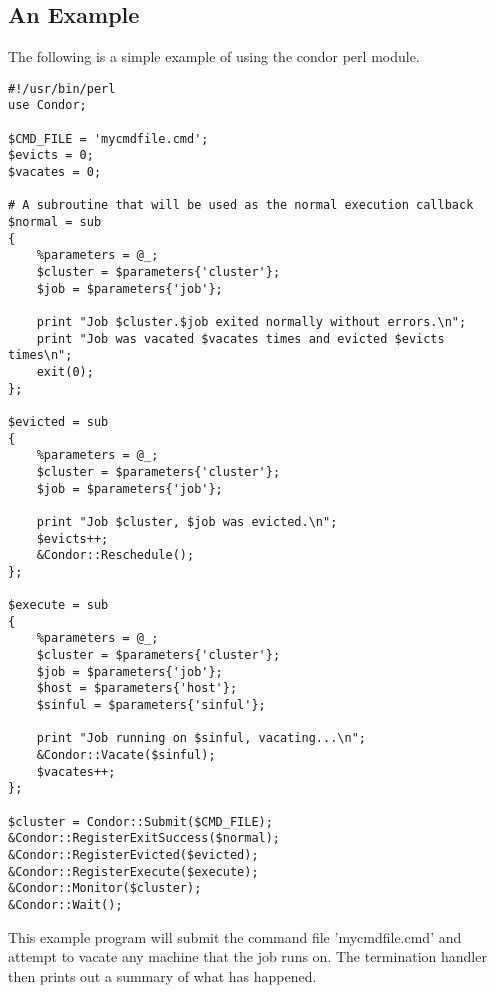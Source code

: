 \subsection{An Example}
The following is a simple example of using the condor perl module.
\begin{verbatim}
#!/usr/bin/perl
use Condor;

$CMD_FILE = 'mycmdfile.cmd';
$evicts = 0;
$vacates = 0;

# A subroutine that will be used as the normal execution callback
$normal = sub
{
    %parameters = @_;
    $cluster = $parameters{'cluster'};
    $job = $parameters{'job'};

    print "Job $cluster.$job exited normally without errors.\n";
    print "Job was vacated $vacates times and evicted $evicts times\n";
    exit(0);
};	

$evicted = sub
{
    %parameters = @_;
    $cluster = $parameters{'cluster'};
    $job = $parameters{'job'};

    print "Job $cluster, $job was evicted.\n";
    $evicts++;
    &Condor::Reschedule();	
};

$execute = sub
{
    %parameters = @_;
    $cluster = $parameters{'cluster'};
    $job = $parameters{'job'};
    $host = $parameters{'host'};
    $sinful = $parameters{'sinful'};

    print "Job running on $sinful, vacating...\n";
    &Condor::Vacate($sinful);
    $vacates++;
};

$cluster = Condor::Submit($CMD_FILE);
&Condor::RegisterExitSuccess($normal);
&Condor::RegisterEvicted($evicted);
&Condor::RegisterExecute($execute);
&Condor::Monitor($cluster);
&Condor::Wait();
\end{verbatim}

This example program will submit the command file 'mycmdfile.cmd' and attempt
to vacate any machine that the job runs on. The termination
handler then prints out a summary of what has happened.

    

